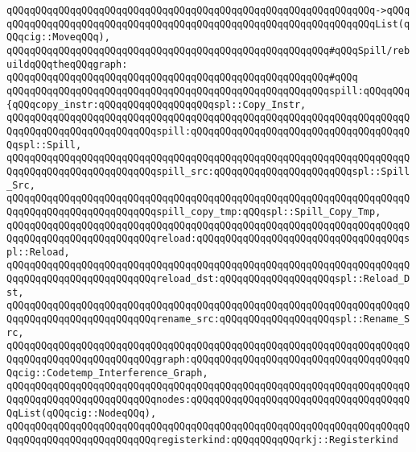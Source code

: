 \verb|qQQqqQQqqQQqqQQqqQQqqQQqqQQqqQQqqQQqqQQqqQQqqQQqqQQqqQQqqQQqqQQq->qQQq|\newline
\verb|qQQqqQQqqQQqqQQqqQQqqQQqqQQqqQQqqQQqqQQqqQQqqQQqqQQqqQQqqQQqqQQqList(qQQqcig::MoveqQQq),|\newline
\newline
\verb|qQQqqQQqqQQqqQQqqQQqqQQqqQQqqQQqqQQqqQQqqQQqqQQqqQQqqQQq#qQQqSpill/rebuildqQQqtheqQQqgraph:|\newline
\verb|qQQqqQQqqQQqqQQqqQQqqQQqqQQqqQQqqQQqqQQqqQQqqQQqqQQqqQQq#qQQq|\newline
\verb|qQQqqQQqqQQqqQQqqQQqqQQqqQQqqQQqqQQqqQQqqQQqqQQqqQQqqQQqspill:qQQqqQQq{qQQqcopy_instr:qQQqqQQqqQQqqQQqqQQqspl::Copy_Instr,|\newline
\verb|qQQqqQQqqQQqqQQqqQQqqQQqqQQqqQQqqQQqqQQqqQQqqQQqqQQqqQQqqQQqqQQqqQQqqQQqqQQqqQQqqQQqqQQqqQQqqQQqspill:qQQqqQQqqQQqqQQqqQQqqQQqqQQqqQQqqQQqqQQqspl::Spill,|\newline
\verb|qQQqqQQqqQQqqQQqqQQqqQQqqQQqqQQqqQQqqQQqqQQqqQQqqQQqqQQqqQQqqQQqqQQqqQQqqQQqqQQqqQQqqQQqqQQqqQQqspill_src:qQQqqQQqqQQqqQQqqQQqqQQqspl::Spill_Src,|\newline
\verb|qQQqqQQqqQQqqQQqqQQqqQQqqQQqqQQqqQQqqQQqqQQqqQQqqQQqqQQqqQQqqQQqqQQqqQQqqQQqqQQqqQQqqQQqqQQqqQQqspill_copy_tmp:qQQqspl::Spill_Copy_Tmp,|\newline
\verb|qQQqqQQqqQQqqQQqqQQqqQQqqQQqqQQqqQQqqQQqqQQqqQQqqQQqqQQqqQQqqQQqqQQqqQQqqQQqqQQqqQQqqQQqqQQqqQQqreload:qQQqqQQqqQQqqQQqqQQqqQQqqQQqqQQqqQQqspl::Reload,|\newline
\verb|qQQqqQQqqQQqqQQqqQQqqQQqqQQqqQQqqQQqqQQqqQQqqQQqqQQqqQQqqQQqqQQqqQQqqQQqqQQqqQQqqQQqqQQqqQQqqQQqreload_dst:qQQqqQQqqQQqqQQqqQQqspl::Reload_Dst,|\newline
\verb|qQQqqQQqqQQqqQQqqQQqqQQqqQQqqQQqqQQqqQQqqQQqqQQqqQQqqQQqqQQqqQQqqQQqqQQqqQQqqQQqqQQqqQQqqQQqqQQqrename_src:qQQqqQQqqQQqqQQqqQQqspl::Rename_Src,|\newline
\verb|qQQqqQQqqQQqqQQqqQQqqQQqqQQqqQQqqQQqqQQqqQQqqQQqqQQqqQQqqQQqqQQqqQQqqQQqqQQqqQQqqQQqqQQqqQQqqQQqgraph:qQQqqQQqqQQqqQQqqQQqqQQqqQQqqQQqqQQqqQQqcig::Codetemp_Interference_Graph,|\newline
\verb|qQQqqQQqqQQqqQQqqQQqqQQqqQQqqQQqqQQqqQQqqQQqqQQqqQQqqQQqqQQqqQQqqQQqqQQqqQQqqQQqqQQqqQQqqQQqqQQqnodes:qQQqqQQqqQQqqQQqqQQqqQQqqQQqqQQqqQQqqQQqList(qQQqcig::NodeqQQq),|\newline
\verb|qQQqqQQqqQQqqQQqqQQqqQQqqQQqqQQqqQQqqQQqqQQqqQQqqQQqqQQqqQQqqQQqqQQqqQQqqQQqqQQqqQQqqQQqqQQqqQQqregisterkind:qQQqqQQqqQQqrkj::Registerkind|\newline
